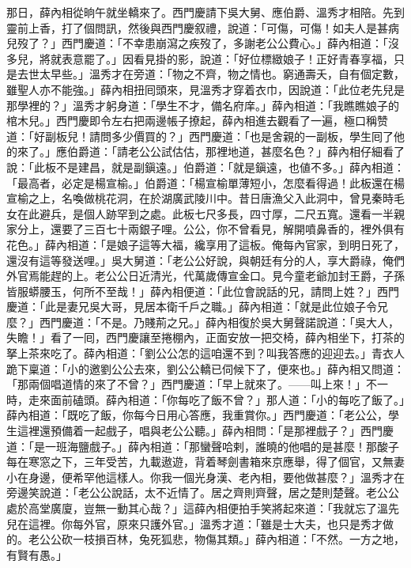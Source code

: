 那日，薛內相從晌午就坐轎來了。西門慶請下吳大舅、應伯爵、溫秀才相陪。先到靈前上香，打了個問訊，然後與西門慶叙禮，說道：「可傷，可傷！如夫人是甚病兒歿了？」{}西門慶道：「不幸患崩瀉之疾歿了，多謝老公公費心。」薛內相道：「沒多兒，將就表意罷了。」因看見掛的影，說道：「好位標緻娘子！{}正好青春享福，只是去世太早些。」溫秀才在旁道：「物之不齊，物之情也。{}窮通壽夭，自有個定數，雖聖人亦不能強。」薛內相扭囘頭來，見溫秀才穿着衣巾，{}因說道：「此位老先兒是那學裡的？」溫秀才躬身道：「學生不才，備名府庠。」薛內相道：「我瞧瞧娘子的棺木兒。」{}西門慶即令左右把兩邊帳子撩起，薛內相進去觀看了一遍，極口稱赞道：「好副板兒！請問多少價買的？」西門慶道：「也是舍親的一副板，學生囘了他的來了。」應伯爵道：「請老公公試估估，那裡地道，甚麼名色？」薛內相仔細看了說：「此板不是建昌，就是副鎭遠。」伯爵道：「就是鎭遠，也値不多。」薛內相道：「最高者，必定是楊宣榆。」伯爵道：「楊宣榆單薄短小，怎麼看得過！此板還在楊宣榆之上，名喚做桃花洞，在於湖廣武陵川中。昔日唐漁父入此洞中，曾見秦時毛女在此避兵，是個人跡罕到之處。此板七尺多長，四寸厚，二尺五寬。還看一半親家分上，還要了三百七十兩銀子哩。公公，你不曾看見，解開噴鼻香的，裡外俱有花色。」薛內相道：「是娘子這等大福，纔享用了這板。俺每內官家，到明日死了，還沒有這等發送哩。」吳大舅道：「老公公好說，與朝廷有分的人，享大爵祿，俺們外官焉能趕的上。老公公日近清光，代萬歲傳宣金口。見今童老爺加封王爵，子孫皆服蟒腰玉，何所不至哉！」薛內相便道：「此位會說話的兄，{}請問上姓？」西門慶道：「此是妻兄吳大哥，見居本衛千戶之職。」薛內相道：「就是此位娘子令兄麼？」{}西門慶道：「不是。乃賤荊之兄。」薛內相復於吳大舅聲諾說道：「吳大人，失瞻！」{}看了一囘，西門慶讓至捲棚內，正面安放一把交椅，薛內相坐下，打茶的拏上茶來吃了。薛內相道：「劉公公怎的這咱還不到？叫我答應的迎迎去。」青衣人跪下稟道：「小的邀劉公公去來，劉公公轎已伺候下了，便來也。」薛內相又問道：「那兩個唱道情的來了不曾？」西門慶道：「早上就來了。——叫上來！」不一時，走來面前磕頭。薛內相道：「你每吃了飯不曾？」那人道：「小的每吃了飯了。」薛內相道：「既吃了飯，你每今日用心答應，我重賞你。」西門慶道：「老公公，學生這裡還預備着一起戲子，唱與老公公聽。」薛內相問：「是那裡戲子？」西門慶道：「是一班海鹽戲子。」薛內相道：「那蠻聲哈剌，誰曉的他唱的是甚麼！那酸子每在寒窓之下，三年受苦，九載遨遊，背着琴劍書箱來京應舉，得了個官，又無妻小在身邊，便希罕他這樣人。你我一個光身漢、老內相，要他做甚麼？」溫秀才在旁邊笑說道：{}「老公公說話，太不近情了。居之齊則齊聲，居之楚則楚聲。老公公處於高堂廣廈，豈無一動其心哉？」這薛內相便拍手笑將起來道：「我就忘了溫先兒在這裡。你每外官，原來只護外官。」溫秀才道：「雖是士大夫，也只是秀才做的。老公公砍一枝損百林，兔死狐悲，物傷其類。」薛內相道：「不然。一方之地，有賢有愚。」

